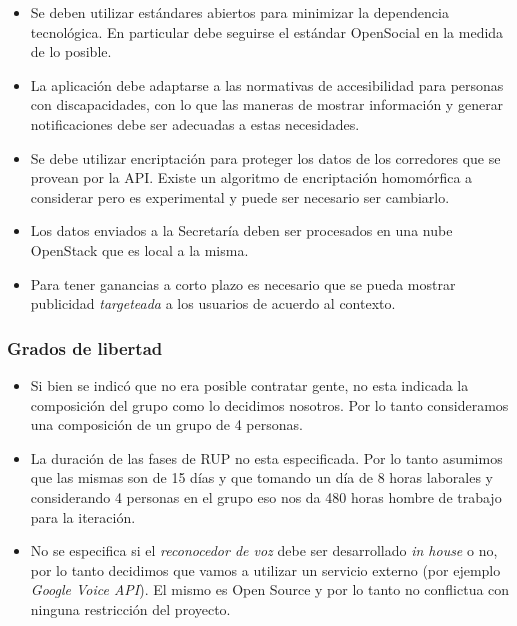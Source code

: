 \begin{itemize}
\itemsep1pt\parskip0pt
\item
  Se deben utilizar estándares abiertos para minimizar la dependencia
  tecnológica. En particular debe seguirse el estándar OpenSocial en la
  medida de lo posible.
\item
  La aplicación debe adaptarse a las normativas de accesibilidad para
  personas con discapacidades, con lo que las maneras de mostrar
  información y generar notificaciones debe ser adecuadas a estas
  necesidades.
\item
  Se debe utilizar encriptación para proteger los datos de los
  corredores que se provean por la API. Existe un algoritmo de
  encriptación homomórfica a considerar pero es experimental y puede ser
  necesario ser cambiarlo.
\item
  Los datos enviados a la Secretaría deben ser procesados en una nube
  OpenStack que es local a la misma.
\item
  Para tener ganancias a corto plazo es necesario que se pueda mostrar
  publicidad \emph{targeteada} a los usuarios de acuerdo al contexto.
\end{itemize}

\subsubsection{Grados de libertad}

\begin{itemize}
\itemsep1pt\parskip0pt
\item
  Si bien se indicó que no era posible contratar gente, no esta indicada
  la composición del grupo como lo decidimos nosotros. Por lo tanto
  consideramos una composición de un grupo de 4 personas.
\item
  La duración de las fases de RUP no esta especificada. Por lo tanto
  asumimos que las mismas son de 15 días y que tomando un día de 8 horas
  laborales y considerando 4 personas en el grupo eso nos da 480 horas
  hombre de trabajo para la iteración.
\item
  No se especifica si el \emph{reconocedor de voz} debe ser desarrollado
  \emph{in house} o no, por lo tanto decidimos que vamos a utilizar un
  servicio externo (por ejemplo \emph{Google Voice API}). El mismo es
  Open Source y por lo tanto no conflictua con ninguna restricción del
  proyecto.
\end{itemize}
